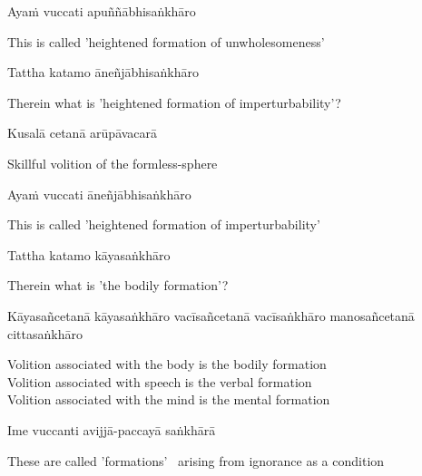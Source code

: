 Ayaṁ vuccati apuññābhisaṅkhāro

\begin{cprenglish}
  This is called 'heightened formation of unwholesomeness'
\end{cprenglish}

Tattha katamo āneñjābhisaṅkhāro

\begin{cprenglish}
  Therein what is 'heightened formation of imperturbability'?
\end{cprenglish}

Kusalā cetanā arūpāvacarā

\begin{cprenglish}
  Skillful volition of the formless-sphere
\end{cprenglish}

Ayaṁ vuccati āneñjābhisaṅkhāro

\begin{cprenglish}
  This is called 'heightened formation of imperturbability'
\end{cprenglish}

Tattha katamo kāyasaṅkhāro

\begin{cprenglish}
  Therein what is 'the bodily formation'?
\end{cprenglish}

Kāyasañcetanā kāyasaṅkhāro vacīsañcetanā vacīsaṅkhāro manosañcetanā cittasaṅkhāro

\begin{cprenglish}
  Volition associated with the body is the bodily formation\\
  Volition associated with speech is the verbal formation\\
  Volition associated with the mind is the mental
  formation
\end{cprenglish}

Ime vuccanti avijjā-paccayā saṅkhārā

\begin{cprenglish}
  These are called 'formations' \breathmark\ arising from ignorance as a condition
\end{cprenglish}

